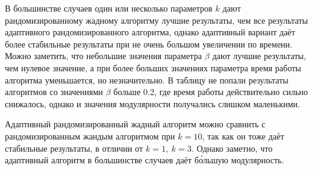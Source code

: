 В большинстве случаев один или несколько параметров $k$ дают рандомизированному жадному алгоритму лучшие результаты, чем все результаты адаптивного рандомизированного алгоритма, однако адаптивный вариант даёт более стабильные результаты при не очень большом увеличении по времени. Можно заметить, что небольшие значения параметра $\beta$ дают лучшие результаты, чем нулевое значение, а при более больших значениях параметра время работы алгоритма уменьшается, но незначительно. В таблицу не попали результаты алгоритмов со значениями $\beta$ больше 0.2, где время работы действительно сильно снижалось, однако и значения модулярности получались слишком маленькими.

Адаптивный рандомизированный жадный алгоритм можно сравнить с рандомизированным жандым алгоритмом при $k = 10$, так как он тоже даёт стабильные результаты, в отличии от $k = 1,\ k = 3$. Однако заметно, что адаптивный алгоритм в большинстве случаев даёт б\'{о}льшую модулярность.